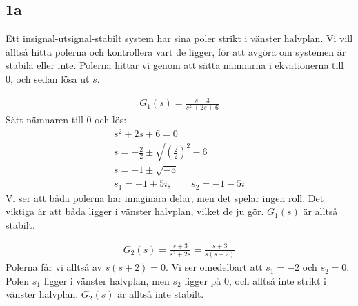 \documentclass[a4paper]{article}
\begin{document}
\subsection{1a}
Ett insignal-utsignal-stabilt system har sina poler strikt i vänster halvplan. Vi vill alltså hitta polerna och kontrollera vart de ligger, för att avgöra om systemen är stabila eller inte. Polerna hittar vi genom att sätta nämnarna i ekvationerna till 0, och sedan lösa ut $s$.

\begin{align*}
  G_1(s) = \frac{s-3}{s^2+2s+6}
\end{align*}
%
Sätt nämnaren till 0 och lös:
\begin{align*}
  s^2+2s+6 = 0\\
  s = -\frac{2}{2} \pm \sqrt{\left(\frac{2}{2}\right)^2 -6}\\
  s = -1 \pm \sqrt{-5}\\
  s_1 = -1 + 5i, \qquad s_2 = -1 - 5i
\end{align*}
%
Vi ser att båda polerna har imaginära delar, men det spelar ingen roll. Det viktiga är att båda ligger i vänster halvplan, vilket de ju gör. $G_1(s)$ är alltså stabilt.

\begin{align*}
  G_2(s) = \frac{s+3}{s^2+2s} = \frac{s+3}{s(s+2)}
\end{align*}
%
Polerna får vi alltså av $s(s+2) = 0$. Vi ser omedelbart att $s_1 = -2$ och $s_2 = 0$. Polen $s_1$ ligger i vänster halvplan, men $s_2$ ligger på 0, och alltså inte strikt i vänster halvplan. $G_2(s)$ är alltså inte stabilt.
\end{document}
